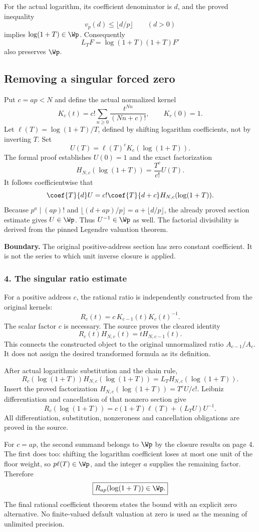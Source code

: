 For the actual logarithm, its coefficient denominator is $d$, and the proved inequality
\[
 v_p(d)\le\lfloor d/p\rfloor\qquad(d>0)
\]
implies $\log(1+T)\in\Wp$. Consequently
\[
 L_TF=\log(1+T)(1+T)F'
\]
also preserves $\Wp$.

\subsection*{Removing a singular forced zero}
Put $c=ap<N$ and define the actual normalized kernel
\[
 K_c(t)=c!\sum_{n\ge0}\frac{t^{Nn}}{(Nn+c)!},\qquad K_c(0)=1.
\]
Let $\ell(T)=\log(1+T)/T$, defined by shifting logarithm coefficients, not by inverting $T$. Set
\[
 U(T)=\ell(T)^cK_c(\log(1+T)).
\]
The formal proof establishes $U(0)=1$ and the exact factorization
\[
 H_{N,c}(\log(1+T))=\frac{T^c}{c!}U(T).
\]
It follows coefficientwise that
\[
 \coef{T}{d}U=c!\coef{T}{d+c}H_{N,c}(\log(1+T)).
\]
Because $p^a\mid(ap)!$ and $\lfloor(d+ap)/p\rfloor=a+\lfloor d/p\rfloor$, the already proved section estimate gives $U\in\Wp$. Thus $U^{-1}\in\Wp$ as well. The factorial divisibility is derived from the pinned Legendre valuation theorem.

\textbf{Boundary.} The original positive-address section has zero constant coefficient. It is not the series to which unit inverse closure is applied.
\par\medskip
\subsubsection*{4. The singular ratio estimate}
For a positive address $c$, the rational ratio is independently constructed from the original kernels:
\[
 R_c(t)=c\,K_{c-1}(t)K_c(t)^{-1}.
\]
The scalar factor $c$ is necessary. The source proves the cleared identity
\[
 \boxed{R_c(t)H_{N,c}(t)=tH_{N,c-1}(t).}
\]
This connects the constructed object to the original unnormalized ratio $A_{c-1}/A_c$. It does not assign the desired transformed formula as its definition.

After actual logarithmic substitution and the chain rule,
\[
 R_c(\log(1+T))H_{N,c}(\log(1+T))
 =L_TH_{N,c}(\log(1+T)).
\]
Insert the proved factorization $H_{N,c}(\log(1+T))=T^cU/c!$. Leibniz differentiation and cancellation of that nonzero section give
\[
 \boxed{R_c(\log(1+T))
 =c(1+T)\ell(T)+(L_TU)U^{-1}.}
\]
All differentiation, substitution, nonzeroness and cancellation obligations are proved in the source.

For $c=ap$, the second summand belongs to $\Wp$ by the closure results on page 4. The first does too: shifting the logarithm coefficient loses at most one unit of the floor weight, so $p\ell(T)\in\Wp$, and the integer $a$ supplies the remaining factor. Therefore
\[
 \boxed{R_{ap}(\log(1+T))\in\Wp.}
\]
The final rational coefficient theorem states the bound with an explicit zero alternative. No finite-valued default valuation at zero is used as the meaning of unlimited precision.


